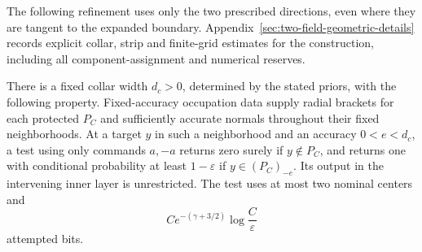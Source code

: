 The following refinement uses only the two prescribed directions, even
where they are tangent to the expanded boundary.
Appendix~\ref{sec:two-field-geometric-details} records explicit collar,
strip and finite-grid estimates for the construction, including all
component-assignment and numerical reserves.
\begin{lemma}
\label{lem:two-field-rare}
There is a fixed collar width $d_c>0$, determined by the stated priors,
with the following property.  Fixed-accuracy occupation data supply
radial brackets for each protected $P_C$ and sufficiently accurate
normals throughout their fixed neighborhoods.  At a target $y$ in such
a neighborhood and an accuracy $0<e<d_c$, a test using only commands
$a,-a$ returns zero surely if $y\notin P_C$, and returns one with
conditional probability at least $1-\varepsilon$ if
$y\in(P_C)_{-e}$.  Its output in the intervening inner layer is
unrestricted.  The test uses at most two nominal centers and
\begin{equation}\label{eq:two-field-rare-cost}
 C e^{-(\gamma+3/2)}\log\frac C\varepsilon
\end{equation}
attempted bits.
\end{lemma}
